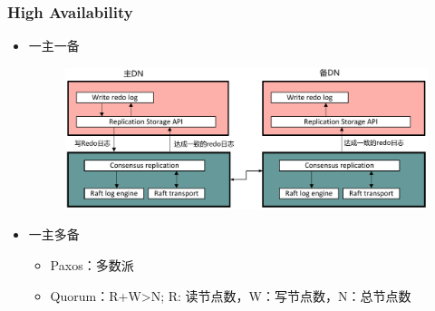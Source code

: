 
\begin{frame}[fragile]
	\frametitle{High Availability}
	\begin{itemize}
		\item 一主一备
		\begin{figure}
			\includegraphics[width=.7\linewidth]{figs/dbfile-ha.pdf}
		\end{figure}
		\item 一主多备
		\begin{itemize}
			\item Paxos：多数派
			\item Quorum：R+W>N; R: 读节点数，W：写节点数，N：总节点数
		\end{itemize}
	\end{itemize}
\end{frame}

% 
% 
% 

